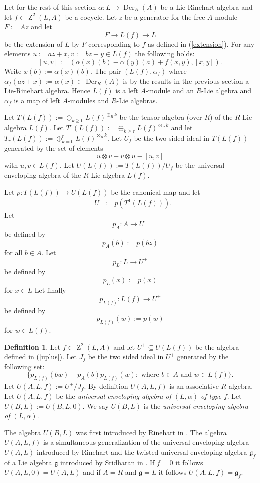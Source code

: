 \documentclass{amsart}
\theoremstyle{plain}
\theoremstyle{definition}
\newtheorem{definition}[theorem]{Definition}
\theoremstyle{remark}
\numberwithin{equation}{theorem}
\begin{document}
Let for the rest of this section
$\alpha:L\rightarrow {\operatorname{Der} }_{R}({A})$ be a Lie-Rinehart algebra and let $f\in {\operatorname{Z}}^2(L,{A})$ be a cocycle.
Let $z$ be a generator for the free ${A}$-module $F:={A} z$ and let
\[ F \rightarrow L(f) \rightarrow L \]
be the extension of $L$ by $F$ corresponding to $f$ as defined in (\ref{extension}).
For any elements $u:=az+x, v:=bz+y \in L(f)$ the following holds:
\[ [u,v]:=(\alpha(x)(b)-\alpha(y)(a)+f(x,y),[x,y]).\]
Write $x(b):=\alpha(x)(b)$.
The pair $(L(f),\alpha_f)$ where $\alpha_f(az+x):=\alpha(x)\in {\operatorname{Der} }_{R}({A})$ is by the results in the previous section
a Lie-Rinehart algebra. Hence $L(f)$ is a left ${A}$-module and an ${R}$-Lie algebra and $\alpha_f$ is a map
of left ${A}$-modules and ${R}$-Lie algebras.

Let $T(L(f)):=\oplus_{k\geq 0}L(f)^{\otimes_{R} k}$ be the tensor algebra (over ${R}$) of the ${R}$-Lie algebra $L(f)$.
Let $T^r(L(f)):=\oplus_{k\geq r}L(f)^{\otimes_{R} k}$ and let $T_r(L(f)):=\oplus_{k=0}^r L(f)^{\otimes_{R} k}$.
Let $U_f$ be the two sided ideal in $T(L(f))$ generated by the set of elements
\[ u\otimes v -v\otimes u -[u,v] \]
with $u,v\in L(f)$. Let $U(L(f)):=T(L(f))/U_f$ be the universal enveloping algebra of the ${R}$-Lie algebra $L(f)$.

Let $p:T(L(f))\rightarrow U(L(f))$ be the canonical map and let 
\begin{align}
&\label{uplus}U^+:=p(T^1(L(f))).
\end{align} 
Let 
\[ p_{A}:{A}\rightarrow U^+ \]
be defined by
\[ p_{A}(b):=p(bz) \]
for all $b\in {A}$.
Let 
\[ p_L:L\rightarrow U^+ \]
be defined by
\[ p_L(x):=p(x)\]
for $x\in L$
Let finally
\[ p_{L(f)}:L(f)\rightarrow U^+ \]
be defined by
\[ p_{L(f)}(w):=p(w) \]
for $w\in L(f)$.

\begin{definition}\label{classuniv}  Let $f\in {\operatorname{Z}}^2(L,{A})$ and let $U^+\subseteq U(L(f))$ be the algebra defined in
(\ref{uplus}). 
Let $J_f$ be the two sided ideal in $U^+$ generated by the following set:
\[ \{ p_{L(f)}(bw)-p_{A}(b)p_{L(f)}(w) :\text{ where $b\in {A}$ and $w\in L(f)$} \}. \]
Let $U({A},L,f):=U^+/J_f$. By definition $U({A},L,f)$ is an associative ${R}$-algebra.
Let $U({A},L,f)$ be the \emph{universal enveloping algebra of $(L,\alpha)$ of type $f$}.
Let $U(B,L):=U(B,L,0)$.
We say $U(B,L)$ is the \emph{universal enveloping algebra of $(L,\alpha)$}.
\end{definition}
The algebra $U(B,L)$ was first introduced by Rinehart in \cite{rinehart}.
The algebra $U({A},L,f)$ is a simultaneous generalization of the universal enveloping algebra $U({A},L)$ 
introduced by Rinehart and the twisted universal enveloping algebra ${\mathfrak{g}}_f$
of a Lie algebra ${\mathfrak{g}}$ introduced by Sridharan in \cite{sridharan}. If $f=0$ it follows $U({A},L,0)=U({A},L)$ and if ${A}={R}$
and ${\mathfrak{g}}=L$ it follows $U({A},L,f)={\mathfrak{g}}_f$.
\end{document}
